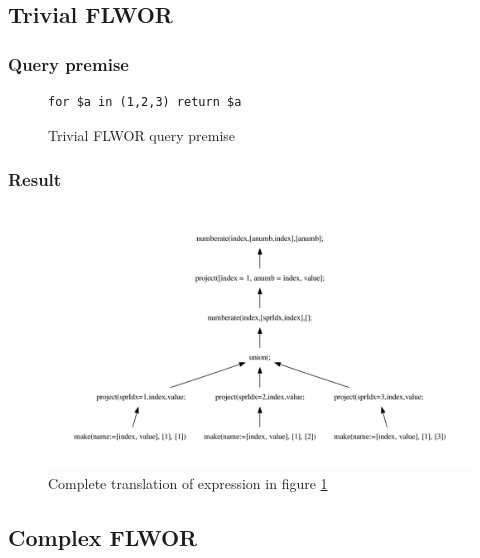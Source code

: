 \subsection{Trivial FLWOR}
\label{sect:results:algebra:generated:trivial_flwor}
\subsubsection{Query premise}
\begin{figure}[!htp]
\begin{center}
\begin{Verbatim}
for $a in (1,2,3) return $a
\end{Verbatim}
  \caption{Trivial FLWOR query premise}
  \label{fig:results:query_trivial_flwor}
\end{center}
\end{figure}

\subsubsection{Result}
\begin{figure}[!htp]
\begin{center}
  \includegraphics[width=1.0\textwidth]{img/graphs/td_impl_flwor_simple_xq_relalg} \caption{Complete translation of expression in figure
  \ref{fig:results:query_trivial_flwor}}
  \label{fig:results:query_trivial_flwor_result}
\end{center}
\end{figure}

\subsection{Complex FLWOR}
\label{sect:results:algebra:generated:complex_flwor}
